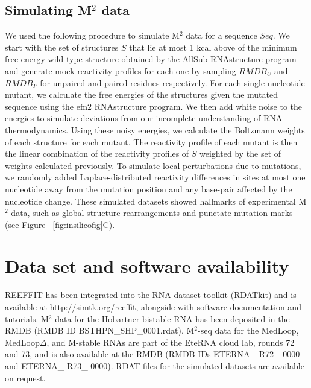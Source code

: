 \documentclass[12pt]{article}
\begin{document}
\subsection{Simulating M$^2$ data}

We used the following procedure to simulate M$^2$ data for a sequence $Seq$. 
We start with the set of structures $S$ that lie at most 1 kcal above of the minimum free energy wild type structure obtained by the $\mbox{AllSub}$ RNAstructure program and generate mock reactivity profiles for each one by sampling $RMDB_U$ and $RMDB_P$ for unpaired and paired residues respectively. 
For each single-nucleotide mutant, we calculate the free energies of the structures given the mutated sequence using the $\mbox{efn2}$ RNAstructure program. 
We then add white noise to the energies to simulate deviations from our incomplete understanding of RNA thermodynamics. Using these noisy energies, we calculate the Boltzmann weights of each structure for each mutant. 
The reactivity profile of each mutant is then the linear combination of the reactivity profiles of $S$ weighted by the set of weights calculated previously. 
To simulate local perturbations due to mutations, we randomly added Laplace-distributed reactivity differences in sites at most one nucleotide away from the mutation position and any base-pair affected by the nucleotide change. 
These simulated datasets showed hallmarks of experimental M$^2$ data, such as global structure rearrangements  and punctate mutation marks (see Figure ~\ref{fig:insilicofig}C).

\section{Data set and software availability}

REEFFIT has been integrated into the RNA dataset toolkit (RDATkit) and is available at http://simtk.org/reeffit, alongside with software documentation and tutorials. 
M$^2$ data for the Hobartner bistable RNA has been deposited in the RMDB (RMDB ID BSTHPN\_SHP\_0001.rdat). 
M$^2$-seq data for the MedLoop, MedLoop$\Delta$, and M-stable RNAs are part of the EteRNA cloud lab, rounds 72 and 73, and is also available at the RMDB (RMDB IDs ETERNA\_ R72\_ 0000 and ETERNA\_ R73\_ 0000). 
RDAT files for the simulated datasets are available on request.



\end{document}
